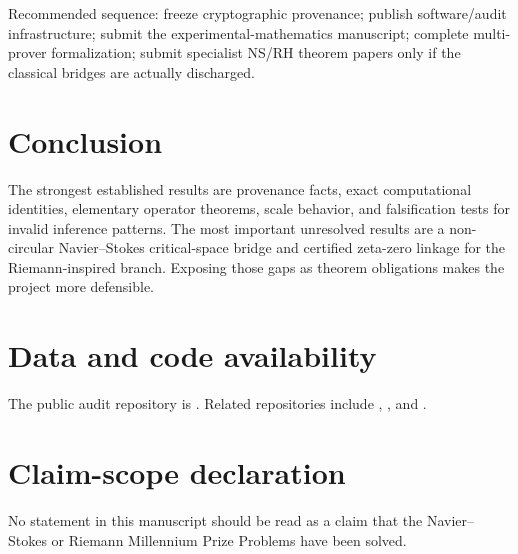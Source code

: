 \documentclass[11pt]{article}
\begin{document}
Recommended sequence: freeze cryptographic provenance; publish software/audit infrastructure; submit the experimental-mathematics manuscript; complete multi-prover formalization; submit specialist NS/RH theorem papers only if the classical bridges are actually discharged.

\section{Conclusion}
The strongest established results are provenance facts, exact computational identities, elementary operator theorems, scale behavior, and falsification tests for invalid inference patterns. The most important unresolved results are a non-circular Navier--Stokes critical-space bridge and certified zeta-zero linkage for the Riemann-inspired branch. Exposing those gaps as theorem obligations makes the project more defensible.

\section*{Data and code availability}
The public audit repository is  \cite{RepoAudit}. Related repositories include , , and  \cite{RepoUniversal,RepoNS,RepoTrans}.

\section*{Claim-scope declaration}
No statement in this manuscript should be read as a claim that the Navier--Stokes or Riemann Millennium Prize Problems have been solved.
\end{document}
